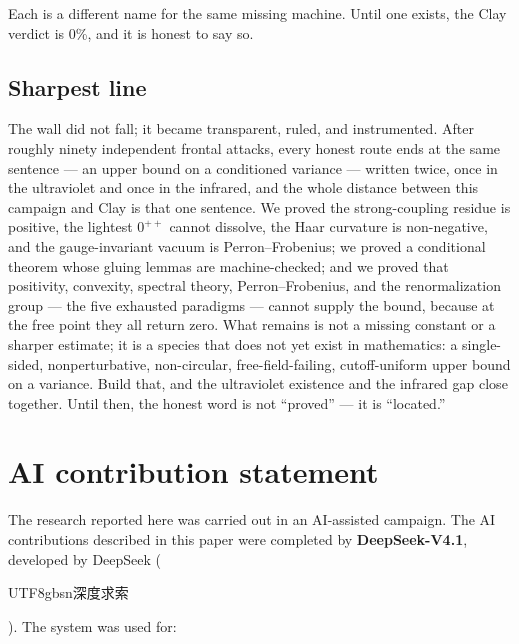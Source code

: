 Each is a different name for the same missing machine. Until one exists, the Clay verdict is 0\%,
and it is honest to say so.

\subsection{Sharpest line}

\begin{qbox}
The wall did not fall; it became transparent, ruled, and instrumented. After roughly ninety
independent frontal attacks, every honest route ends at the same sentence --- an upper bound on a
conditioned variance --- written twice, once in the ultraviolet and once in the infrared, and the
whole distance between this campaign and Clay is that one sentence. We proved the strong-coupling
residue is positive, the lightest $0^{++}$ cannot dissolve, the Haar curvature is non-negative,
and the gauge-invariant vacuum is Perron--Frobenius; we proved a conditional theorem whose gluing
lemmas are machine-checked; and we proved that positivity, convexity, spectral theory,
Perron--Frobenius, and the renormalization group --- the five exhausted paradigms --- cannot
supply the bound, because at the free point they all return zero. What remains is not a missing
constant or a sharper estimate; it is a species that does not yet exist in mathematics: a
single-sided, nonperturbative, non-circular, free-field-failing, cutoff-uniform upper bound on a
variance. Build that, and the ultraviolet existence and the infrared gap close together. Until
then, the honest word is not ``proved'' --- it is ``located.''
\end{qbox}

\section{AI contribution statement}
\label{sec:ai}

The research reported here was carried out in an AI-assisted campaign. The AI contributions
described in this paper were completed by \textbf{DeepSeek-V4.1}, developed by DeepSeek
(\begin{CJK}{UTF8}{gbsn}深度求索\end{CJK}). The system was used for:


